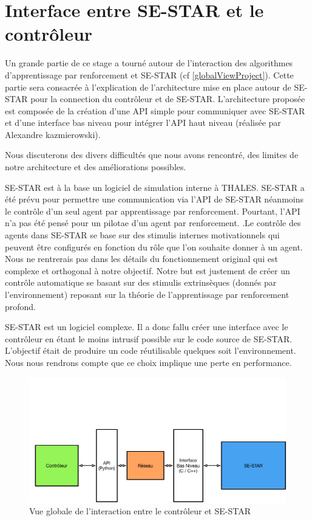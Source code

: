 
\section{Interface entre SE-STAR et le contrôleur}

Un grande partie de ce stage a tourné autour de l'interaction des algorithmes d'apprentissage par renforcement et SE-STAR (cf \ref{globalViewProject}). Cette partie sera consacrée à l'explication de l'architecture mise en place autour de SE-STAR pour la connection du contrôleur et de SE-STAR.
L'architecture proposée est composée de la création d'une \gls{API} simple pour communiquer avec SE-STAR et d'une interface bas niveau pour intégrer l'\gls{API} haut niveau (réalisée par Alexandre  kazmierowski).

Nous discuterons des divers difficultés que nous avons rencontré, des limites de notre architecture et des améliorations possibles.


SE-STAR est à la base un logiciel de simulation interne à THALES. SE-STAR a été prévu pour permettre une communication via l'\gls{API} de SE-STAR néanmoins le contrôle d'un seul agent par apprentissage par renforcement. Pourtant, l'API n'a pas été pensé pour un pilotae d'un agent par renforcement.  .Le contrôle des agents dans SE-STAR se base sur des stimulis internes motivationnels qui peuvent être configurés en fonction du rôle que l'on souhaite donner à un agent. Nous ne rentrerais pas dans les détails du fonctionnement original qui est complexe et orthogonal à notre objectif. Notre but est justement de créer un contrôle automatique se basant sur des stimulis extrinsèques (donnés par l'environnement) reposant sur la théorie de l'apprentissage par renforcement profond.

SE-STAR est un logiciel complexe. Il a donc fallu créer une interface  avec le contrôleur en étant le moins intrusif possible sur le code source de SE-STAR. L'objectif était de produire un code réutilisable quelques soit l'environnement. Nous nous rendrons compte que ce choix implique une perte en performance.

\begin{figure}[!h]
\centering
\includegraphics[width=.9\linewidth]{./assets/interfaceReseau/overviewInterface}
\caption{Vue globale de l'interaction entre le contrôleur et SE-STAR}
\end{figure}

